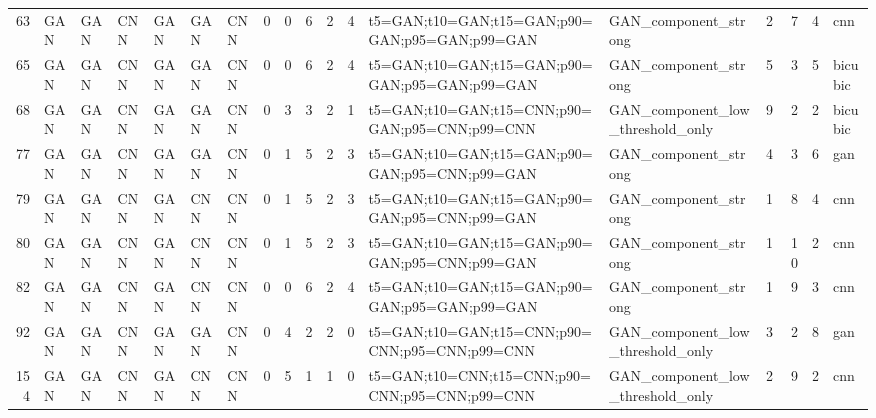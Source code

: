 \begin{tabular}{rllllllrrrrrllrrrl}
63 & GAN & GAN & CNN & GAN & GAN & CNN & 0 & 0 & 6 & 2 & 4 & t5=GAN;t10=GAN;t15=GAN;p90=GAN;p95=GAN;p99=GAN & GAN_component_strong & 2 & 7 & 4 & cnn \\
65 & GAN & GAN & CNN & GAN & GAN & CNN & 0 & 0 & 6 & 2 & 4 & t5=GAN;t10=GAN;t15=GAN;p90=GAN;p95=GAN;p99=GAN & GAN_component_strong & 5 & 3 & 5 & bicubic \\
68 & GAN & GAN & CNN & GAN & GAN & CNN & 0 & 3 & 3 & 2 & 1 & t5=GAN;t10=GAN;t15=CNN;p90=GAN;p95=CNN;p99=CNN & GAN_component_low_threshold_only & 9 & 2 & 2 & bicubic \\
77 & GAN & GAN & CNN & GAN & GAN & CNN & 0 & 1 & 5 & 2 & 3 & t5=GAN;t10=GAN;t15=GAN;p90=GAN;p95=CNN;p99=GAN & GAN_component_strong & 4 & 3 & 6 & gan \\
79 & GAN & GAN & CNN & GAN & CNN & CNN & 0 & 1 & 5 & 2 & 3 & t5=GAN;t10=GAN;t15=GAN;p90=GAN;p95=CNN;p99=GAN & GAN_component_strong & 1 & 8 & 4 & cnn \\
80 & GAN & GAN & CNN & GAN & CNN & CNN & 0 & 1 & 5 & 2 & 3 & t5=GAN;t10=GAN;t15=GAN;p90=GAN;p95=CNN;p99=GAN & GAN_component_strong & 1 & 10 & 2 & cnn \\
82 & GAN & GAN & CNN & GAN & CNN & CNN & 0 & 0 & 6 & 2 & 4 & t5=GAN;t10=GAN;t15=GAN;p90=GAN;p95=GAN;p99=GAN & GAN_component_strong & 1 & 9 & 3 & cnn \\
92 & GAN & GAN & CNN & GAN & GAN & CNN & 0 & 4 & 2 & 2 & 0 & t5=GAN;t10=GAN;t15=CNN;p90=CNN;p95=CNN;p99=CNN & GAN_component_low_threshold_only & 3 & 2 & 8 & gan \\
154 & GAN & GAN & CNN & GAN & CNN & CNN & 0 & 5 & 1 & 1 & 0 & t5=GAN;t10=CNN;t15=CNN;p90=CNN;p95=CNN;p99=CNN & GAN_component_low_threshold_only & 2 & 9 & 2 & cnn \\
\bottomrule
\end{tabular}
